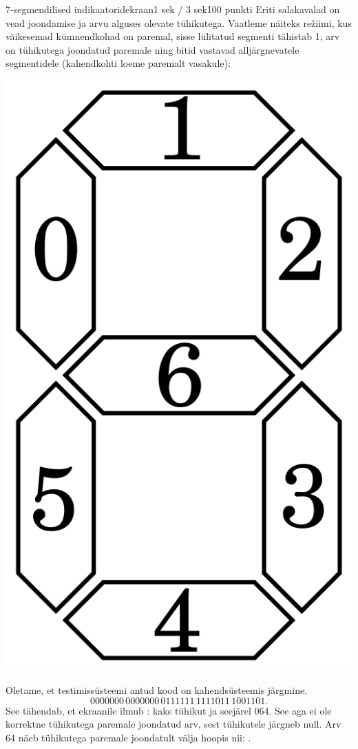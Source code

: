 \begin{yl}{6}{7-segmendilised indikaatorid}{ekraan}{1 sek / 3 sek}{100 punkti}
  Eriti salakavalad on vead joondamise ja arvu alguses olevate tühikutega.
  Vaatleme näiteks režiimi, kus väikesemad kümnendkohad on paremal, sisse lülitatud
  segmenti tähistab 1, arv on tühikutega joondatud paremale ning bitid vastavad
  alljärgnevatele segmentidele (kahendkohti loeme paremalt vasakule):

  \begin{center}
    \includegraphics[scale=0.2]{mode1}
  \end{center}

  Oletame, et testimissüsteemi antud kood on kahendsüsteemis järgmine.
  \[ 0000000 \, 0000000 \, 0111111 \, 1111011 \, 1001101. \]
  See tähendab, et ekraanile ilmub :
  kaks tühikut ja seejärel 064. See aga ei ole korrektne tühikutega paremale joondatud
  arv, sest tühikutele järgneb null. Arv 64 näeb tühikutega paremale joondatult
  välja hoopis nii: .


\end{yl}
